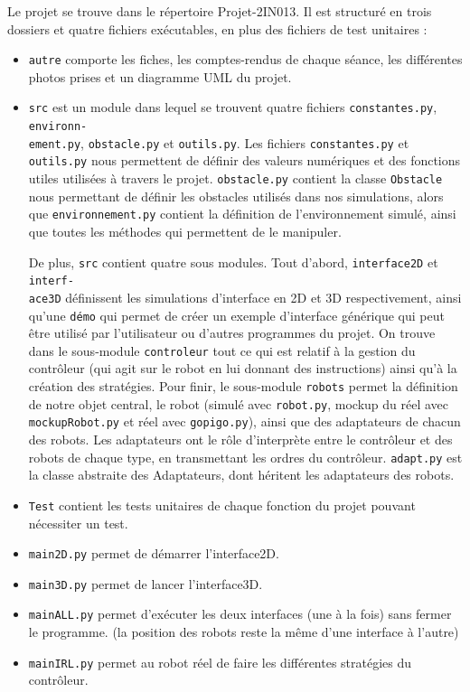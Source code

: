 \documentclass[12pt]{article}
\begin{document}
Le projet se trouve dans le répertoire Projet-2IN013. Il est structuré en trois dossiers et quatre fichiers exécutables, en plus des fichiers de test unitaires : 
\begin{itemize}[label=-]
    \item \texttt{autre} comporte les fiches, les comptes-rendus de chaque séance, les différentes photos prises et un diagramme UML du projet.
    \item \texttt{src} est un module dans lequel se trouvent quatre fichiers \texttt{constantes.py}, \texttt{environn-\\ement.py}, \texttt{obstacle.py} et \texttt{outils.py}. Les fichiers \texttt{constantes.py} et \texttt{outils.py} nous permettent de définir des valeurs numériques et des fonctions utiles utilisées à travers le projet. \texttt{obstacle.py} contient la classe \texttt{Obstacle} nous permettant de définir les obstacles utilisés dans nos simulations, alors que \texttt{environnement.py} contient la définition de l'environnement simulé, ainsi que toutes les méthodes qui permettent de le manipuler.
    
    De plus, \texttt{src} contient quatre sous modules. Tout d'abord, \texttt{interface2D} et \texttt{interf-\\ace3D} définissent les simulations d'interface en 2D et 3D respectivement, ainsi qu'une \texttt{démo} qui permet de créer un exemple d'interface générique qui peut être utilisé par l'utilisateur ou d'autres programmes du projet. On trouve dans le sous-module \texttt{controleur} tout ce qui est relatif à la gestion du contrôleur (qui agit sur le robot en lui donnant des instructions) ainsi qu'à la création des stratégies. Pour finir, le sous-module \texttt{robots} permet la définition de notre objet central, le robot (simulé avec \texttt{robot.py}, mockup du réel avec \texttt{mockupRobot.py} et réel avec \texttt{gopigo.py}), ainsi que des adaptateurs de chacun des robots. Les adaptateurs ont le rôle d'interprète entre le contrôleur et des robots de chaque type, en transmettant les ordres du contrôleur. \texttt{adapt.py} est la classe abstraite des Adaptateurs, dont héritent les adaptateurs des robots.
    
    \item \texttt{Test} contient les tests unitaires de chaque fonction du projet pouvant nécessiter un test.
    \item \texttt{main2D.py} permet de démarrer l'interface2D.
    \item \texttt{main3D.py} permet de lancer l'interface3D.
    \item \texttt{mainALL.py} permet d'exécuter les deux interfaces (une à la fois) sans fermer le programme. (la position des robots reste la même d'une interface à l'autre)
    \item \texttt{mainIRL.py} permet au robot réel de faire les différentes stratégies du contrôleur.
\end{itemize}
\end{document}
